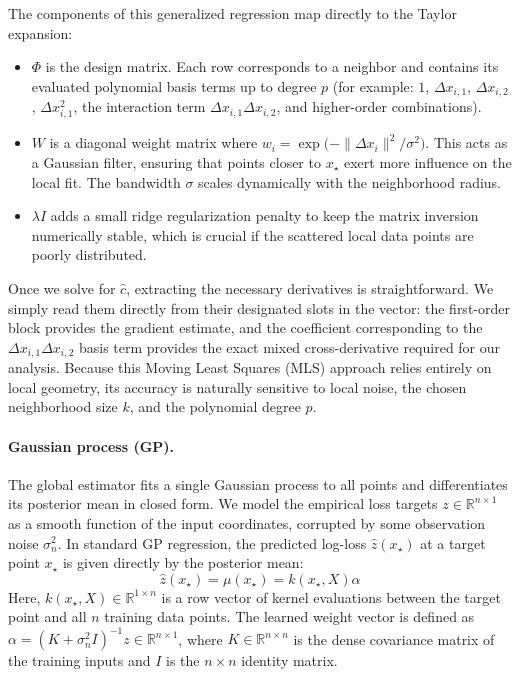 \documentclass[]{fairmeta}
\begin{document}
The components of this generalized regression map directly to the Taylor expansion:
\begin{itemize}
    \item $\Phi$ is the design matrix. Each row corresponds to a neighbor and contains its evaluated polynomial basis terms up to degree $p$ (for example: $1$, $\Delta x_{i,1}$, $\Delta x_{i,2}$, $\Delta x_{i,1}^2$, the interaction term $\Delta x_{i,1}\Delta x_{i,2}$, and higher-order combinations). 
    \item $W$ is a diagonal weight matrix where $w_i=\exp\!\big(\!-\|\Delta x_i\|^2/\sigma^2\big)$. This acts as a Gaussian filter, ensuring that points closer to $x_\star$ exert more influence on the local fit. The bandwidth $\sigma$ scales dynamically with the neighborhood radius.
    \item $\lambda I$ adds a small ridge regularization penalty to keep the matrix inversion numerically stable, which is crucial if the scattered local data points are poorly distributed.
\end{itemize}

Once we solve for $\hat{c}$, extracting the necessary derivatives is straightforward. We simply read them directly from their designated slots in the vector: the first-order block provides the gradient estimate, and the coefficient corresponding to the $\Delta x_{i,1}\Delta x_{i,2}$ basis term provides the exact mixed cross-derivative required for our analysis. Because this Moving Least Squares (MLS) approach relies entirely on local geometry, its accuracy is naturally sensitive to local noise, the chosen neighborhood size $k$, and the polynomial degree $p$.

\paragraph{Gaussian process (GP).} The global estimator fits a single Gaussian process to all points and differentiates its posterior mean in closed form. We model the empirical loss targets $z \in \mathbb{R}^{n \times 1}$ as a smooth function of the input coordinates, corrupted by some observation noise $\sigma_n^2$. In standard GP regression, the predicted log-loss $\hat{z}(x_\star)$ at a target point $x_\star$ is given directly by the posterior mean:
$$ \hat{z}(x_\star) = \mu(x_\star) = k(x_\star, X)\alpha $$
Here, $k(x_\star, X) \in \mathbb{R}^{1 \times n}$ is a row vector of kernel evaluations between the target point and all $n$ training data points. The learned weight vector is defined as $\alpha = (K + \sigma_n^2 I)^{-1}z \in \mathbb{R}^{n \times 1}$, where $K \in \mathbb{R}^{n \times n}$ is the dense covariance matrix of the training inputs and $I$ is the $n \times n$ identity matrix.
\end{document}
